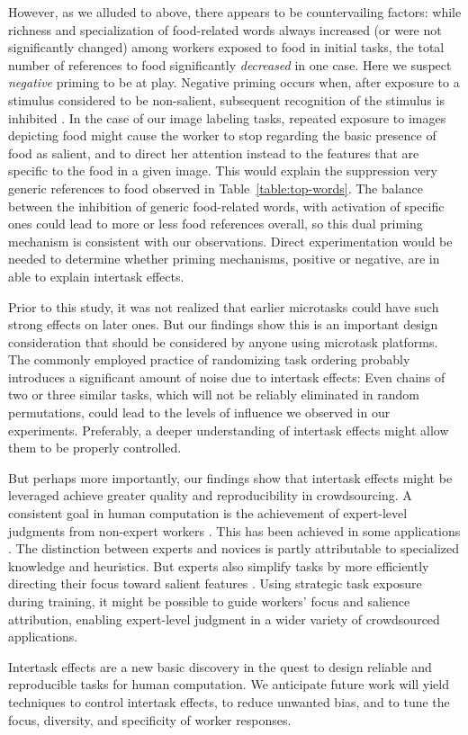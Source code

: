 \documentclass{sigchi}
\begin{document}
However, as we alluded to above, there appears to be countervailing 
factors:
while richness and specialization of food-related words always increased 
(or were not significantly changed) among workers exposed to food in 
initial tasks, the total number of references to food significantly 
\textit{decreased} in one case.  
Here we suspect \textit{negative} priming to be at play.
Negative priming occurs when, after exposure to a stimulus 
considered to be non-salient, subsequent recognition of the stimulus is 
inhibited \cite{mayr2007negative}.  In the case of our image labeling 
tasks, repeated exposure to images depicting food might cause the worker to
stop regarding the basic presence of food as salient, and to direct her 
attention instead to the features that are specific to the food in a given 
image.  This would explain the suppression very generic references to 
food observed in Table~\ref{table:top-words}.  
The balance between the inhibition of generic food-related words, with 
activation of specific ones could lead to more or less food references
overall, so this dual priming mechanism is consistent with our 
observations.  Direct experimentation would be needed to determine whether
priming mechanisms, positive or negative, are in able to explain intertask
effects.

Prior to this study, it was not realized that earlier microtasks could 
have such strong effects on later ones.
But our findings show this is an important design consideration that 
should be considered by anyone using microtask platforms.
The commonly employed practice of randomizing task ordering probably
introduces a significant amount of noise due to intertask effects:
Even chains of two or three similar tasks, which will not be reliably 
eliminated in random permutations, could lead to the levels of influence 
we observed in our experiments.  Preferably, a deeper understanding of 
intertask effects might allow them to be properly controlled.

But perhaps more importantly, our findings show that intertask effects 
might be leveraged achieve greater quality and reproducibility in 
crowdsourcing.
A consistent goal in human computation is the achievement of expert-level
judgments from non-expert workers \cite{kittur2011crowdforge}.  
This has been achieved in some
applications \cite{snow2008cheap,Mortensen20131020,Warby2014385}. 
The distinction between experts and novices is partly attributable
to specialized knowledge and heuristics. 
But experts also simplify tasks by more efficiently directing 
their focus toward salient features \cite{kellman2009perceptual}.  
Using strategic task exposure during training, it might be possible to 
guide workers' focus and salience attribution, enabling expert-level 
judgment in a wider variety of crowdsourced applications.

Intertask effects are a new basic discovery in the quest to design 
reliable and reproducible tasks for human computation.
We anticipate future work will yield techniques to control intertask 
effects, to reduce unwanted bias, and to tune the focus, diversity, and 
specificity of worker responses.



\end{document}
